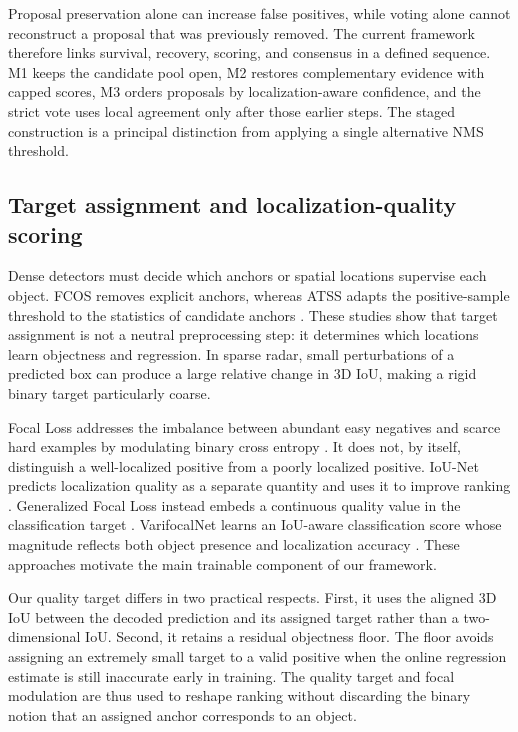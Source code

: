 \documentclass[preprint,12pt,times]{elsarticle}
\begin{document}
Proposal preservation alone can increase false positives, while voting alone
cannot reconstruct a proposal that was previously removed. The current
framework therefore links survival, recovery, scoring, and consensus in a
defined sequence. M1 keeps the candidate pool open, M2 restores complementary
evidence with capped scores, M3 orders proposals by localization-aware
confidence, and the strict vote uses local agreement only after those earlier
steps. The staged construction is a principal distinction from applying a
single alternative NMS threshold.

\subsection{Target assignment and localization-quality scoring}

Dense detectors must decide which anchors or spatial locations supervise each
object. FCOS removes explicit anchors, whereas ATSS adapts the positive-sample
threshold to the statistics of candidate anchors
\cite{tian2019fcos,zhang2020atss}. These studies show that target assignment is
not a neutral preprocessing step: it determines which locations learn
objectness and regression. In sparse radar, small perturbations of a predicted
box can produce a large relative change in 3D IoU, making a rigid binary target
particularly coarse.

Focal Loss addresses the imbalance between abundant easy negatives and scarce
hard examples by modulating binary cross entropy
\cite{lin2017focal}. It does not, by itself, distinguish a well-localized
positive from a poorly localized positive. IoU-Net predicts localization
quality as a separate quantity and uses it to improve ranking
\cite{jiang2018iounet}. Generalized Focal Loss instead embeds a continuous
quality value in the classification target \cite{li2022gfl}. VarifocalNet
learns an IoU-aware classification score whose magnitude reflects both object
presence and localization accuracy \cite{zhang2021varifocalnet}. These
approaches motivate the main trainable component of our framework.

Our quality target differs in two practical respects. First, it uses the
aligned 3D IoU between the decoded prediction and its assigned target rather
than a two-dimensional IoU. Second, it retains a residual objectness floor.
The floor avoids assigning an extremely small target to a valid positive when
the online regression estimate is still inaccurate early in training. The
quality target and focal modulation are thus used to reshape ranking without
discarding the binary notion that an assigned anchor corresponds to an object.
\end{document}
